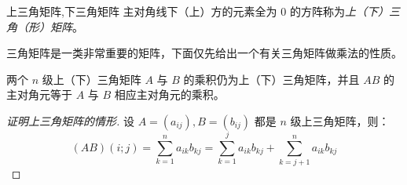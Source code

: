 \begin{definition}{上三角矩阵,下三角矩阵}
	主对角线下（上）方的元素全为 $0$ 的方阵称为\emph{上（下）三角（形）矩阵}。
\end{definition}

三角矩阵是一类非常重要的矩阵，下面仅先给出一个有关三角矩阵做乘法的性质。

\begin{theorem}
	两个 $n$ 级上（下）三角矩阵 $A$ 与 $B$ 的乘积仍为上（下）三角矩阵，并且 $AB$ 的主对角元等于 $A$ 与 $B$ 相应主对角元的乘积。
\end{theorem}

\begin{proof}[证明上三角矩阵的情形]
	设 $A = (a_{ij}), B = (b_{ij})$ 都是 $n$ 级上三角矩阵，则：
	$$
	(AB)(i; j) = \sum\limits_{k = 1}^n a_{ik} b_{kj} = \sum\limits_{k = 1}^j a_{ik}b_{kj} + \sum\limits_{k = j + 1}^n a_{ik} b_{kj}
	$$


\end{proof}